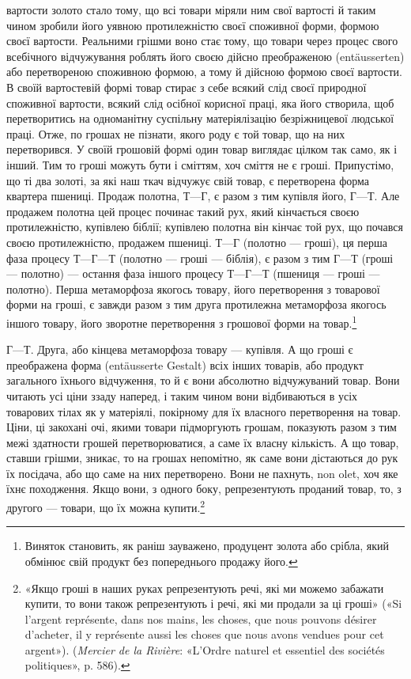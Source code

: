 \parcont{}  %
вартости золото стало тому, що всі товари міряли ним свої вартості
й таким чином зробили його уявною протилежністю своєї
споживної форми, формою своєї вартости. Реальними грішми
воно стає тому, що товари через процес свого всебічного відчужування
роблять його своєю дійсно преображеною (entäusserten)
або перетвореною споживною формою, а тому й дійсною формою
своєї вартости. В своїй вартостевій формі товар стирає з себе
всякий слід своєї природної споживної вартости, всякий слід
осібної корисної праці, яка його створила, щоб перетворитись
на одноманітну суспільну матеріялізацію безріжницевої людської
праці. Отже, по грошах не пізнати, якого роду є той товар,
що на них перетворився. У своїй грошовій формі один товар
виглядає цілком так само, як і інший. Тим то гроші можуть бути
і сміттям, хоч сміття не є гроші. Припустімо, що ті два золоті,
за які наш ткач відчужує свій товар, є перетворена форма квартера
пшениці. Продаж полотна, $Т — Г$, є разом з тим купівля
його, $Г — Т$. Але продажем полотна цей процес починає такий
рух, який кінчається своєю протилежністю, купівлею біблії;
купівлею полотна він кінчає той рух, що почався своєю протилежністю,
продажем пшениці. $Т — Г$ (полотно — гроші), ця перша
фаза процесу $Т — Г — Т$ (полотно — гроші — біблія), є разом
з тим $Г — Т$ (гроші — полотно) — остання фаза іншого процесу
$Т — Г — Т$ (пшениця — гроші — полотно). Перша метаморфоза
якогось товару, його перетворення з товарової форми на гроші,
є завжди разом з тим друга протилежна метаморфоза якогось
іншого товару, його зворотне перетворення з грошової форми на
товар.\footnote{
Виняток становить, як раніш зауважено, продуцент золота або
срібла, який обмінює свій продукт без попереднього продажу його.
}

$Г — Т$. Друга, або кінцева метаморфоза товару — купівля.
А що гроші є преображена форма (entäusserte Gestalt) всіх інших
товарів, або продукт загального їхнього відчуження, то й є вони
абсолютно відчужуваний товар. Вони читають усі ціни ззаду
наперед, і таким чином вони відбиваються в усіх товарових тілах
як у матеріялі, покірному для їх власного перетворення на товар.
Ціни, ці закохані очі, якими товари підморгують грошам, показують
разом з тим межі здатности грошей перетворюватися, а
саме їх власну кількість. А що товар, ставши грішми, зникає,
то на грошах непомітно, як саме вони дістаються до рук їх посідача,
або що саме на них перетворено. Вони не пахнуть, non olet,
хоч яке їхнє походження. Якщо вони, з одного боку, репрезентують
проданий товар, то, з другого — товари, що їх можна
купити.\footnote{
«Якщо гроші в наших руках репрезентують речі, які ми можемо
забажати купити, то вони також репрезентують і речі, які ми продали за
ці гроші» («Si l’argent représente, dans nos mains, les choses, que nous
pouvons désirer d’acheter, il y représente aussi les choses que nous avons
vendues pour cet argent»). (\emph{Mercier de la Rivière}: «L’Ordre naturel et
essentiel des sociétés politiques», p. 586).
}
